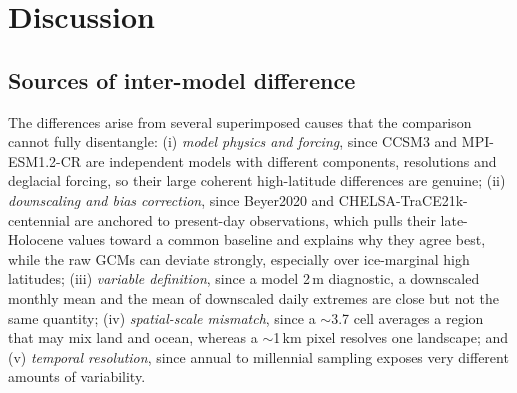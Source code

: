 \documentclass{isprs}
\newcommand{\dg}{\textdegree}
\begin{document}
\section{Discussion}

\subsection{Sources of inter-model difference}
The differences arise from several superimposed causes that the comparison cannot fully disentangle: (i) \emph{model physics and forcing}, since CCSM3 and MPI-ESM1.2-CR are independent models with different components, resolutions and deglacial forcing, so their large coherent high-latitude differences are genuine; (ii) \emph{downscaling and bias correction}, since Beyer2020 and CHELSA-TraCE21k-centennial are anchored to present-day observations, which pulls their late-Holocene values toward a common baseline and explains why they agree best, while the raw GCMs can deviate strongly, especially over ice-marginal high latitudes; (iii) \emph{variable definition}, since a model 2\,m diagnostic, a downscaled monthly mean and the mean of downscaled daily extremes are close but not the same quantity; (iv) \emph{spatial-scale mismatch}, since a $\sim$3.7\dg{} cell averages a region that may mix land and ocean, whereas a $\sim$1\,km pixel resolves one landscape; and (v) \emph{temporal resolution}, since annual to millennial sampling exposes very different amounts of variability.
\end{document}
